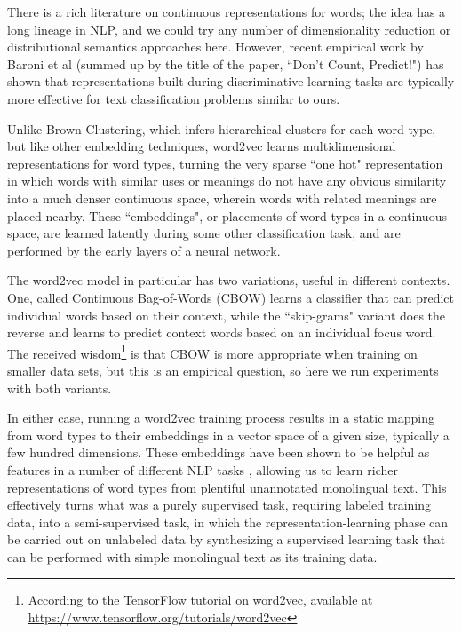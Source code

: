 There is a rich literature on continuous representations for words; the idea
has a long lineage in NLP, and we could try any number of dimensionality
reduction or distributional semantics approaches here. However, recent
empirical work by Baroni et al \cite{baroni2014don} (summed up by the title of
the paper, ``Don't Count, Predict!") has shown that representations built
during discriminative learning tasks are typically more effective for text
classification problems similar to ours.

Unlike Brown Clustering, which infers hierarchical clusters for each word type,
but like other embedding techniques, word2vec learns multidimensional
representations for word types, turning the very sparse ``one hot"
representation in which words with similar uses or meanings do not have any
obvious similarity into a much denser continuous space, wherein words with
related meanings are placed nearby. These ``embeddings", or placements of word
types in a continuous space, are learned latently during some other
classification task, and are performed by the early layers of a neural network.

The word2vec model in particular has two variations, useful in different
contexts. One, called Continuous Bag-of-Words (CBOW) learns a classifier that
can predict individual words based on their context, while the ``skip-grams"
variant does the reverse and learns to predict context words based on an
individual focus word. The received wisdom\footnote{According to the TensorFlow
tutorial on word2vec, available at
\url{https://www.tensorflow.org/tutorials/word2vec}} is that CBOW is more
appropriate when training on smaller data sets, but this is an empirical
question, so here we run experiments with both variants.

In either case, running a word2vec training process results in a static mapping
from word types to their embeddings in a vector space of a given size,
typically a few hundred dimensions. These embeddings have been shown to be
helpful as features in a number of different NLP tasks \cite{baroni2014don},
allowing us to learn richer representations of word types from plentiful
unannotated monolingual text. This effectively turns what was a purely
supervised task, requiring labeled training data, into a semi-supervised task,
in which the representation-learning phase can be carried out on unlabeled data
by synthesizing a supervised learning task that can be performed with simple
monolingual text as its training data.

